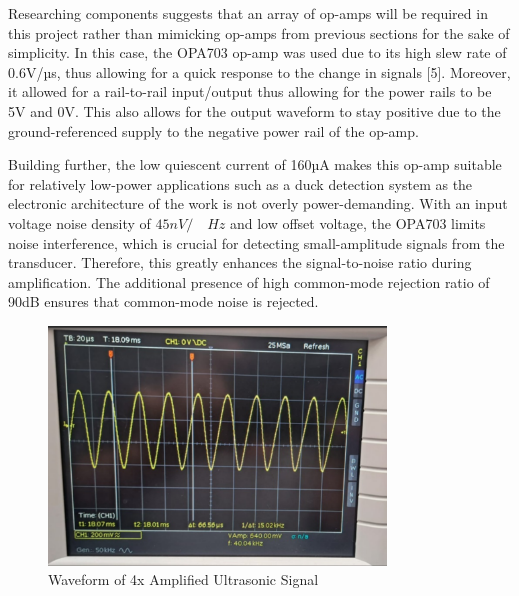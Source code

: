 Researching components suggests that an array of op-amps will be required in this project rather than mimicking op-amps from previous sections for the sake of simplicity. In this case, the OPA703 op-amp was used due to its high slew rate of 0.6V/µs, thus allowing for a quick response to the change in signals [5]. Moreover, it allowed for a rail-to-rail input/output thus allowing for the power rails to be 5V and 0V. This also allows for the output waveform to stay positive due to the ground-referenced supply to the negative power rail of the op-amp.

Building further, the low quiescent current of 160µA makes this op-amp suitable for relatively low-power applications such as a duck detection system as the electronic architecture of the work is not overly power-demanding. With an input voltage noise density of \(45nV/\quad{Hz}\) and low offset voltage, the OPA703 limits noise interference, which is crucial for detecting small-amplitude signals from the transducer. Therefore, this greatly enhances the signal-to-noise ratio during amplification. The additional presence of high common-mode rejection ratio of 90dB ensures that common-mode noise is rejected.
\begin{figure}[h]
    \centering
    \includegraphics[width=0.8\textwidth]{subpages/images/ultra_4_gain.png}
    \caption{Waveform of 4x Amplified Ultrasonic Signal}
    \label{fig:waveform_4x_gain}
\end{figure}

